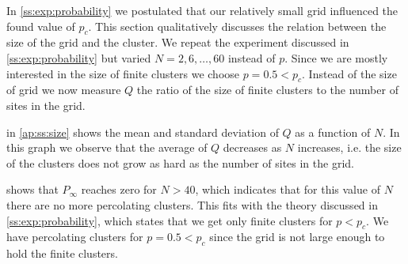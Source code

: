 
In \cref{ss:exp:probability} we postulated that our relatively small grid influenced the found value of $p_c$. This section qualitatively discusses the relation between the size of the grid and the cluster. We repeat the experiment discussed in \cref{ss:exp:probability} but varied $N = 2, 6, \dotsc, 60$ instead of $p$. Since we are mostly interested in the size of finite clusters we choose $p = 0.5 < p_c$. Instead of the size of grid we now measure $Q$ the ratio of the size of finite clusters to the number of sites in the grid. 

 in \cref{ap:ss:size} shows the mean and standard deviation of $Q$ as a function of $N$. In this graph we observe that the average of $Q$ decreases as $N$ increases, i.e. the size of the clusters does not grow as hard as the number of sites in the grid.  

 shows that $P_\infty$ reaches zero for $N > 40$, which indicates that for this value of $N$ there are no more percolating clusters. This fits with the theory discussed in \cref{ss:exp:probability}, which states that we get only finite clusters for $p < p_c$. We have percolating clusters for $p = 0.5 < p_c$ since the grid is not large enough to hold the finite clusters.\\ 

